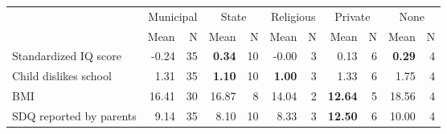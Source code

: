 \begin{tabular}{l r r r r r r r r r r}
\toprule
& \multicolumn{2}{c}{Municipal} & \multicolumn{2}{c}{State} & \multicolumn{2}{c}{Religious} & \multicolumn{2}{c}{Private} & \multicolumn{2}{c}{None} \\
& \scriptsize Mean & \scriptsize N & \scriptsize Mean & \scriptsize N & \scriptsize Mean & \scriptsize N & \scriptsize Mean & \scriptsize N & \scriptsize Mean & \scriptsize N \\
\midrule
Standardized IQ score &     -0.24 &        35 & \textbf{     0.34} &        10 &     -0.00 &         3 &      0.13 &         6 & \textbf{     0.29} &         4 \\
Child dislikes school &      1.31 &        35 & \textbf{     1.10} &        10 & \textbf{     1.00} &         3 &      1.33 &         6 &      1.75 &         4 \\
BMI &     16.41 &        30 &     16.87 &         8 &     14.04 &         2 & \textbf{    12.64} &         5 &     18.56 &         4 \\
SDQ reported by parents &      9.14 &        35 &      8.10 &        10 &      8.33 &         3 & \textbf{    12.50} &         6 &     10.00 &         4 \\
\bottomrule
\end{tabular}
